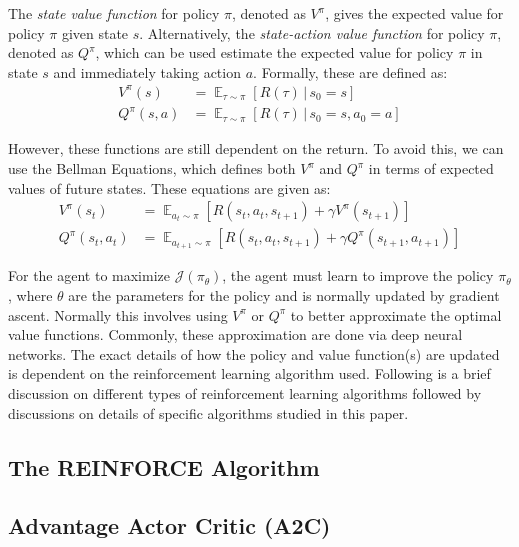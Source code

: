 \documentclass[conference]{IEEEtran}
\begin{document}
The \textit{state value function} for policy $\pi$, denoted as $V^\pi$, gives the expected value for policy $\pi$ given state $s$. Alternatively, the \textit{state-action value function} for policy $\pi$, denoted as $Q^\pi$, which can be used estimate the expected value for policy $\pi$ in state $s$ and immediately taking action $a$. Formally, these are defined as:
\begin{align*}
    V^\pi(s)    & = \mathop{\mathbb{E}}_{\tau \sim \pi}[R(\tau) \, | \, s_0 = s]          \\
    Q^\pi(s, a) & = \mathop{\mathbb{E}}_{\tau \sim \pi}[R(\tau) \, | \, s_0 = s, a_0 = a]
\end{align*}

However, these functions are still dependent on the return. To avoid this, we can use the Bellman Equations, which defines both $V^\pi$ and $Q^\pi$ in terms of expected values of future states. \cite{deep_rl_survey, spinning_up_intro, sutton2018reinforcement} These equations are given as:
\begin{align*}
    V^\pi(s_t)      & = \mathop{\mathbb{E}}_{a_t \sim \pi} [ R(s_t, a_t, s_{t+1}) + \gamma V^\pi(s_{t+1})]              \\
    Q^\pi(s_t, a_t) & = \mathop{\mathbb{E}}_{a_{t+1} \sim \pi} [ R(s_t, a_t, s_{t+1}) + \gamma Q^\pi(s_{t+1}, a_{t+1})]
\end{align*}

For the agent to maximize $\mathcal{J}(\pi_\theta)$, the agent must learn to improve the policy $\pi_\theta$, where $\theta$ are the parameters for the policy and is normally updated by gradient ascent. Normally this involves using $V^\pi$ or $Q^\pi$ to better approximate the optimal value functions. Commonly, these approximation are done via deep neural networks. The exact details of how the policy and value function(s) are updated is dependent on the reinforcement learning algorithm used. Following is a brief discussion on different types of reinforcement learning algorithms followed by discussions on details of specific algorithms studied in this paper.

\subsection{The REINFORCE Algorithm}

\subsection{Advantage Actor Critic (A2C)}
\end{document}
